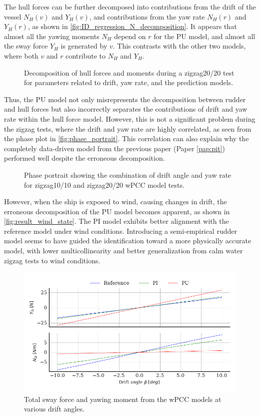 The hull forces can be further decomposed into contributions from the drift of the vessel $N_H(v)$ and $Y_H(v)$, and contributions from the yaw rate $N_H(r)$ and $Y_H(r)$, as shown in \autoref{fig:ID_regression_N_decomposition}. It appears that almost all the yawing moments $N_H$ depend on $r$ for the PU model, and almost all the sway force $Y_H$ is generated by $v$. This contrasts with the other two models, where both $v$ and $r$ contribute to $N_H$ and $Y_H$.

\begin{figure}[h] \begin{center}  \caption{Decomposition of hull forces and moments during a zigzag20/20 test for parameters related to drift, yaw rate, and the prediction models.} \label{fig:ID_regression_N_decomposition} \end{center} \end{figure}

Thus, the PU model not only misrepresents the decomposition between rudder and hull forces but also incorrectly separates the contributions of drift and yaw rate within the hull force model. However, this is not a significant problem during the zigzag tests, where the drift and yaw rate are highly correlated, as seen from the phase plot in \autoref{fig:phase_portrait}. This correlation can also explain why the completely data-driven model from the previous paper (Paper \ref{pap:pit}) performed well despite the erroneous decomposition.

\begin{figure}[h] \centering  \caption{Phase portrait showing the combination of drift angle and yaw rate for zigzag10/10 and zigzag20/20 wPCC model tests.} \label{fig:phase_portrait} \end{figure}

However, when the ship is exposed to wind, causing changes in drift, the erroneous decomposition of the PU model becomes apparent, as shown in \autoref{fig:result_wind_state}. The PI model exhibits better alignment with the reference model under wind conditions. Introducing a semi-empirical rudder model seems to have guided the identification toward a more physically accurate model, with lower multicollinearity and better generalization from calm water zigzag tests to wind conditions.

\begin{figure}[h!] \includegraphics[width=\textwidth]{kappa/images/result_wind_state.forces.pdf} \caption{Total sway force and yawing moment from the wPCC models at various drift angles.} \label{fig:result_wind_state} \end{figure}

\FloatBarrier \clearpage